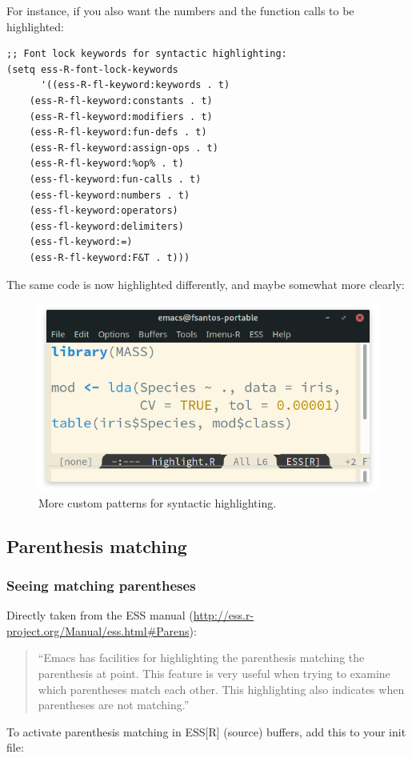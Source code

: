 \documentclass[11pt]{article}
\begin{document}
For instance, if you also want the numbers and the function calls to be highlighted:

\begin{verbatim}
;; Font lock keywords for syntactic highlighting:
(setq ess-R-font-lock-keywords
      '((ess-R-fl-keyword:keywords . t)
	(ess-R-fl-keyword:constants . t)
	(ess-R-fl-keyword:modifiers . t)
	(ess-R-fl-keyword:fun-defs . t)
	(ess-R-fl-keyword:assign-ops . t)
	(ess-R-fl-keyword:%op% . t)
	(ess-fl-keyword:fun-calls . t)
	(ess-fl-keyword:numbers . t)
	(ess-fl-keyword:operators)
	(ess-fl-keyword:delimiters)
	(ess-fl-keyword:=)
	(ess-R-fl-keyword:F&T . t)))
\end{verbatim}

The same code is now highlighted differently, and maybe somewhat more clearly:

\begin{figure}[htbp]
\centering
\includegraphics[width=0.55 \textwidth]{./images/highlight_custom.png}
\caption{\label{fig:orgddb6ca3}More custom patterns for syntactic highlighting.}
\end{figure}

\subsection{Parenthesis matching}
\label{sec:orga35b965}
\subsubsection{Seeing matching parentheses}
\label{sec:org98180e4}
Directly taken from the ESS manual (\url{http://ess.r-project.org/Manual/ess.html\#Parens}):

\begin{quote}
``Emacs has facilities for highlighting the parenthesis matching the parenthesis at point. This feature is very useful when trying to examine which parentheses match each other. This highlighting also indicates when parentheses are not matching.''
\end{quote}

To activate parenthesis matching in ESS[R] (source) buffers, add this to your init file:
\end{document}
